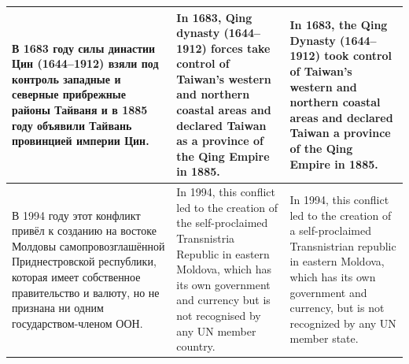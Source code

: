\begin{longtable}{|p{}|p{}|p{}|}
	\hline
	В 1683 году силы династии Цин (1644--1912) взяли под контроль западные и северные прибрежные районы Тайваня и в 1885 году объявили Тайвань провинцией империи Цин.                                                & In 1683, Qing dynasty (1644--1912) forces take control of Taiwan's western and northern coastal areas and declared Taiwan as a province of the Qing Empire in 1885.                                   & In 1683, the Qing Dynasty (1644--1912) took control of Taiwan's western and northern coastal areas and declared Taiwan a province of the Qing Empire in 1885.                                       \\
	\hline
	В 1994 году этот конфликт привёл к созданию на востоке Молдовы самопровозглашённой Приднестровской республики, которая имеет собственное правительство и валюту, но не признана ни одним государством-членом ООН. & In 1994, this conflict led to the creation of the self-proclaimed Transnistria Republic in eastern Moldova, which has its own government and currency but is not recognised by any UN member country. & In 1994, this conflict led to the creation of a self-proclaimed Transnistrian republic in eastern Moldova, which has its own government and currency, but is not recognized by any UN member state. \\
	\hline
\end{longtable}
